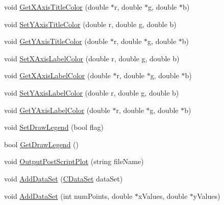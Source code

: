 \begin{DoxyCompactItemize}
void \hyperlink{class_c_plot2_d_afb8a7aa2bfbe7265e44692a20d4c7945}{Get\-X\-Axis\-Title\-Color} (double $\ast$r, double $\ast$g, double $\ast$b)
\item 
void \hyperlink{class_c_plot2_d_ad4bc117bbbab34f188214916089bcb58}{Set\-Y\-Axis\-Title\-Color} (double r, double g, double b)
\item 
void \hyperlink{class_c_plot2_d_a0ab0dcdd3a5638ebd9b4af31e349a13f}{Get\-Y\-Axis\-Title\-Color} (double $\ast$r, double $\ast$g, double $\ast$b)
\item 
void \hyperlink{class_c_plot2_d_af0f4b38b6630d9c8990871f632ab5c5d}{Set\-X\-Axis\-Label\-Color} (double r, double g, double b)
\item 
void \hyperlink{class_c_plot2_d_aeded80b5c17c88c2c6117189ec50cc14}{Get\-X\-Axis\-Label\-Color} (double $\ast$r, double $\ast$g, double $\ast$b)
\item 
void \hyperlink{class_c_plot2_d_acbced06ab78d12b8aeb629cab65a436c}{Set\-Y\-Axis\-Label\-Color} (double r, double g, double b)
\item 
void \hyperlink{class_c_plot2_d_ad97b2872c2774924da3043ea393c05bf}{Get\-Y\-Axis\-Label\-Color} (double $\ast$r, double $\ast$g, double $\ast$b)
\item 
void \hyperlink{class_c_plot2_d_ab83818c0b33b681012cb1440daeb316f}{Set\-Draw\-Legend} (bool flag)
\item 
bool \hyperlink{class_c_plot2_d_a9f6398668790241afcfd9754f5fdb9e3}{Get\-Draw\-Legend} ()
\item 
void \hyperlink{class_c_plot2_d_acf2efd0042c664abea79dfaf77309125}{Output\-Post\-Script\-Plot} (string file\-Name)
\item 
void \hyperlink{class_c_plot2_d_a8d025a540093bbdcca6955e26edc1c24}{Add\-Data\-Set} (\hyperlink{class_c_data_set}{C\-Data\-Set} data\-Set)
\item 
void \hyperlink{class_c_plot2_d_a51b9d9656b23a8aee96cbaf99078aeca}{Add\-Data\-Set} (int num\-Points, double $\ast$x\-Values, double $\ast$y\-Values)
\end{DoxyCompactItemize}
